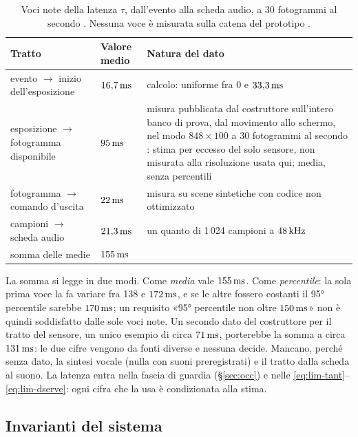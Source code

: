 \begin{table}[H]\centering\small
\caption{Voci note della latenza $\tau$, dall'evento alla scheda audio, a 30 fotogrammi al secondo . Nessuna voce è misurata sulla catena del prototipo .}\label{tab:lim-latenza}
\begin{tabularx}{\linewidth}{@{}p{5.2cm}p{2.0cm}L@{}}
\toprule
Tratto & Valore medio & Natura del dato\\
\midrule
evento $\to$ inizio dell'esposizione & $16{,}7\,\mathrm{ms}$ & calcolo: uniforme fra 0 e $33{,}3\,\mathrm{ms}$\\
esposizione $\to$ fotogramma disponibile & $95\,\mathrm{ms}$ & misura pubblicata dal costruttore sull'intero banco di prova, dal movimento allo schermo, nel modo $848\times100$ a 30 fotogrammi al secondo \cite{realsense-alta-velocita-d435}: stima per eccesso del solo sensore, non misurata alla risoluzione usata qui; media, senza percentili\\
fotogramma $\to$ comando d'uscita & $22\,\mathrm{ms}$ & misura su scene sintetiche con codice non ottimizzato\\
campioni $\to$ scheda audio & $21{,}3\,\mathrm{ms}$ & un quanto di 1\,024 campioni a $48\,\mathrm{kHz}$\\
\midrule
somma delle medie & $155\,\mathrm{ms}$ & \\
\bottomrule
\end{tabularx}
\end{table}

La somma si legge in due modi. Come \emph{media} vale $155\,\mathrm{ms}$. Come \emph{percentile}: la sola prima voce la fa variare fra 138 e $172\,\mathrm{ms}$, e se le altre fossero costanti il 95° percentile sarebbe $170\,\mathrm{ms}$; un requisito «95° percentile non oltre $150\,\mathrm{ms}$» non è quindi soddisfatto dalle sole voci note. Un secondo dato del costruttore per il tratto del sensore, un unico esempio di circa $71\,\mathrm{ms}$, porterebbe la somma a circa $131\,\mathrm{ms}$: le due cifre vengono da fonti diverse e nessuna decide. Mancano, perché senza dato, la sintesi vocale (nulla con suoni preregistrati) e il tratto dalla scheda al suono. La latenza entra nella fascia di guardia (\S\ref{sec:occ}) e nelle \eqref{eq:lim-tant}--\eqref{eq:lim-dserve}: ogni cifra che la usa è condizionata alla stima.

\subsection{Invarianti del sistema}\label{sec:lim-invarianti}

